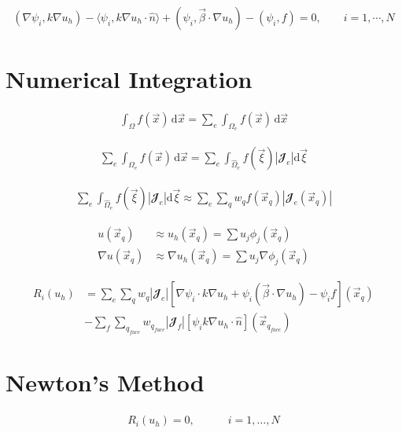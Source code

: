 \documentclass{article}
\begin{document}
	\begin{align*}
		(\nabla \psi_i , k \nabla u_h) - \langle \psi_i , k \nabla u_h \cdot \hat{n} \rangle + \left(\psi_i , \vec{\beta} \cdot \nabla u_h \right) - (\psi_i , f) = 0, \hspace{2em} i = 1, \cdots,N
	\end{align*}
	
	\section*{Numerical Integration}
	
	\begin{align*}
		\int_{\Omega} f(\vec{x}) \, \text{d} \vec{x} = \sum_{e} \int_{\Omega_e} f(\vec{x}) \, \text{d} \vec{x}
	\end{align*}
	
	\begin{align*}
		\sum_{e} \int_{\Omega_e} f(\vec{x}) \, \text{d} \vec{x} = \sum_{e} \int_{\hat{\Omega}_e} f(\vec{\xi}) |\mathbfcal{J}_e| \text{d} \vec{\xi}
	\end{align*}
	
	\begin{align*}
		\sum_{e} \int_{\hat{\Omega}_e} f(\vec{\xi}) |\mathbfcal{J}_e| \text{d} \vec{\xi} \approx \sum_{e} \sum_{q} w_q f(\vec{x}_q) |\mathbfcal{J}_e(\vec{x}_q)|
	\end{align*}
	
	\begin{align*}
		u(\vec{x}_q) &\approx u_h(\vec{x}_q) = \sum u_j \phi_j(\vec{x}_q) \\
		\nabla u(\vec{x}_q) &\approx \nabla u_h(\vec{x}_q) = \sum u_j \nabla \phi_j (\vec{x}_q)
	\end{align*}
	
	\begin{align*}
		R_i (u_h) &= \sum_e \sum_q w_q |\mathbfcal{J}_e| \left[ \nabla \psi_i \cdot k \nabla u_h + \psi_i \left( \vec{\beta} \cdot \nabla u_h \right) - \psi_i f \right] (\vec{x}_q) \\
		&- \sum_f \sum_{q_{face}} w_{q_{face}} |\mathbfcal{J}_f| [\psi_i k\nabla u_h \cdot \hat{n}](\vec{x}_{q_{face}})
	\end{align*}
	
	\section*{Newton's Method}
	
	\begin{align*}
		R_i(u_h) = 0, \hspace{3em} i = 1, \dots ,N
	\end{align*}
	
\end{document}
